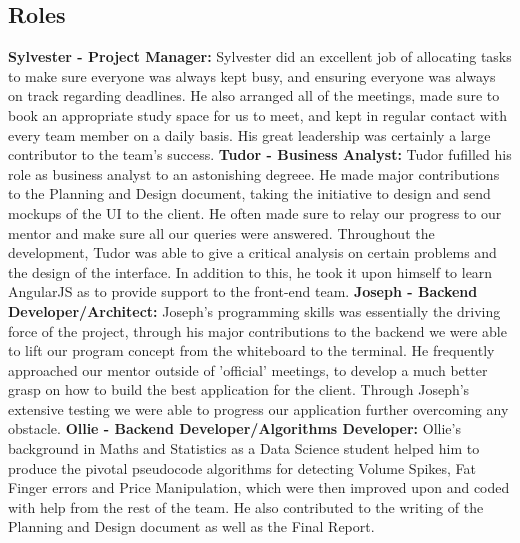 \documentclass[12pt]{article}
\begin{document}
  \subsection{Roles}
  \textbf{Sylvester - Project Manager:}\newline
  Sylvester did an excellent job of allocating tasks to make sure everyone was always kept busy, and ensuring everyone was always on track regarding deadlines.
  He also arranged all of the meetings, made sure to book an appropriate study space for us to meet, and kept in regular contact with every team member on a daily basis.
  His great leadership was certainly a large contributor to the team’s success.
  \newline\newline\textbf{Tudor - Business Analyst:}\newline
  Tudor fufilled his role as business analyst to an astonishing degreee. He made major contributions to the Planning and Design document, taking the initiative to design and send mockups of the UI to the client.
  He often made sure to relay our progress to our mentor and make sure all our queries were answered. Throughout the development, Tudor was able to give a critical analysis on certain problems and
  the design of the interface. In addition to this, he took it upon himself to learn AngularJS as to provide support to the front-end team.
  \newline\newline\textbf{Joseph - Backend Developer/Architect:}\newline
  Joseph's programming skills was essentially the driving force of the project, through his major contributions to the backend we were able to lift our program concept from the whiteboard to the terminal.
  He frequently approached our mentor outside of 'official' meetings, to develop a much better grasp on how to build the best application for the client. Through Joseph's extensive testing we were able
  to progress our application further overcoming any obstacle.
  \newline\newline\textbf{Ollie - Backend Developer/Algorithms Developer:}\newline
  Ollie’s background in Maths and Statistics as a Data Science student helped him to produce the pivotal pseudocode algorithms for detecting  Volume Spikes, Fat Finger errors and Price Manipulation,
  which were then improved upon and coded with help from the rest of the team. He also contributed to the writing of the Planning and Design document as well as the Final Report.
\end{document}
